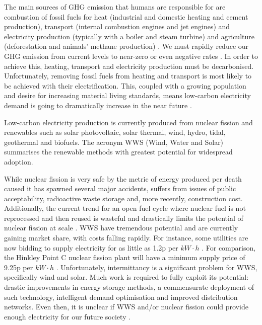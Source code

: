 The main sources of GHG emission that humans are responsible for are combustion of fossil fuels for heat (industrial and domestic heating and cement production), transport (internal combustion engines and jet engines) and electricity production (typically with a boiler and steam turbine) and agriculture (deforestation and animals' methane production) \cite{}. We must rapidly reduce our GHG emission from current levels to near-zero or even negative rates \cite{}. In order to achieve this, heating, transport and electricity production must be decarbonised. Unfortunately, removing fossil fuels from heating and transport is most likely to be achieved with their electrification. This, coupled with a growing population and desire for increasing material living standards, means low-carbon electricity demand is going to dramatically increase in the near future \cite{}. 


Low-carbon electricity production is currently produced from nuclear fission and renewables such as solar photovoltaic, solar thermal, wind, hydro, tidal, geothermal and biofuels. The acronym WWS (Wind, Water and Solar)  summarises the renewable methods with greatest potential for widespread adoption. 

While nuclear fission is very safe by the metric of energy produced per death caused \cite{} it has spawned several major accidents, suffers from issues of public acceptability, radioactive waste storage and, more recently, construction cost. Additionally, the current trend for an open fuel cycle where nuclear fuel is not reprocessed and then reused is wasteful and drastically limits the potential of nuclear fission at scale \cite{}. WWS have tremendous potential and are currently gaining market share, with costs falling rapidly. For instance, some utilities are now bidding to supply electricity for as little as 1.2p per $kW \cdot h$ \cite{}. For comparison, the Hinkley Point C nuclear fission plant will have a minimum supply price of 9.25p per $kW \cdot h$ \cite{}. Unfortunately, intermittancy is a significant problem for WWS, specifically wind and solar. Much work is required to fully exploit its potential: drastic improvements in energy storage methods, a commensurate deployment of such technology, intelligent demand optimisation and improved distribution networks. Even then, it is unclear if WWS and/or nuclear fission could provide enough electricity for our future society \cite{}. 

